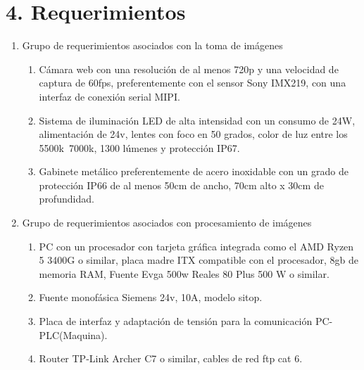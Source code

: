 \documentclass[11pt]{charter}
\begin{document}
\section{4. Requerimientos}
\label{sec:requerimientos}

\begin{enumerate}
\item Grupo de requerimientos asociados con la toma de imágenes
	\begin{enumerate}
	\item Cámara web con una resolución de al menos 720p y una velocidad de captura de 60fps, preferentemente con el sensor Sony IMX219, con una interfaz de conexión serial MIPI.
	\item Sistema de iluminación LED de alta intensidad con un consumo de 24W, alimentación de 24v, lentes con foco en 50 grados, color de luz entre los 5500k~7000k, 1300 lúmenes y protección IP67.
	\item Gabinete metálico preferentemente de acero inoxidable con un grado de protección IP66 de al menos 50cm de ancho, 70cm alto x 30cm de profundidad.
	\end{enumerate}
\item Grupo de requerimientos asociados con procesamiento de imágenes
	\begin{enumerate}
	\item PC con un procesador con tarjeta gráfica integrada como el AMD Ryzen 5 3400G o similar, placa madre ITX compatible con el procesador, 8gb de memoria RAM, Fuente Evga 500w Reales 80 Plus 500 W o similar.
	\item Fuente monofásica Siemens 24v, 10A, modelo sitop.
	\item Placa de interfaz y adaptación de tensión para la comunicación PC-PLC(Maquina).
	\item Router TP-Link Archer C7 o similar, cables de red ftp cat 6. 
	\end{enumerate}
\end{enumerate}
\end{document}
